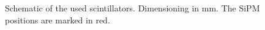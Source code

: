 \begin{figure}[H]
	\hfill
	\hfill
	\caption[Schematics of the used scintillators]{Schematic of the used scintillators. Dimensioning in $\si{\milli\meter}$. The SiPM positions are marked in red.}
	\label{ap:C:crystals}
\end{figure}
















